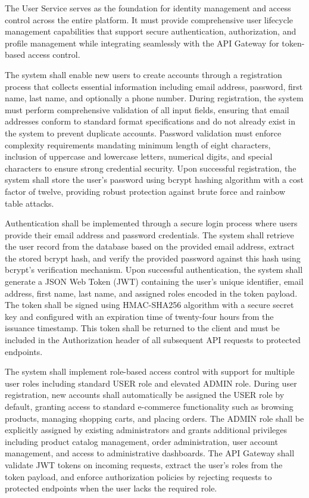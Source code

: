 The User Service serves as the foundation for identity management and access control across the entire platform. It must provide comprehensive user lifecycle management capabilities that support secure authentication, authorization, and profile management while integrating seamlessly with the API Gateway for token-based access control.

The system shall enable new users to create accounts through a registration process that collects essential information including email address, password, first name, last name, and optionally a phone number. During registration, the system must perform comprehensive validation of all input fields, ensuring that email addresses conform to standard format specifications and do not already exist in the system to prevent duplicate accounts. Password validation must enforce complexity requirements mandating minimum length of eight characters, inclusion of uppercase and lowercase letters, numerical digits, and special characters to ensure strong credential security. Upon successful registration, the system shall store the user's password using bcrypt hashing algorithm with a cost factor of twelve, providing robust protection against brute force and rainbow table attacks.

Authentication shall be implemented through a secure login process where users provide their email address and password credentials. The system shall retrieve the user record from the database based on the provided email address, extract the stored bcrypt hash, and verify the provided password against this hash using bcrypt's verification mechanism. Upon successful authentication, the system shall generate a JSON Web Token (JWT) containing the user's unique identifier, email address, first name, last name, and assigned roles encoded in the token payload. The token shall be signed using HMAC-SHA256 algorithm with a secure secret key and configured with an expiration time of twenty-four hours from the issuance timestamp. This token shall be returned to the client and must be included in the Authorization header of all subsequent API requests to protected endpoints.

The system shall implement role-based access control with support for multiple user roles including standard USER role and elevated ADMIN role. During user registration, new accounts shall automatically be assigned the USER role by default, granting access to standard e-commerce functionality such as browsing products, managing shopping carts, and placing orders. The ADMIN role shall be explicitly assigned by existing administrators and grants additional privileges including product catalog management, order administration, user account management, and access to administrative dashboards. The API Gateway shall validate JWT tokens on incoming requests, extract the user's roles from the token payload, and enforce authorization policies by rejecting requests to protected endpoints when the user lacks the required role.

